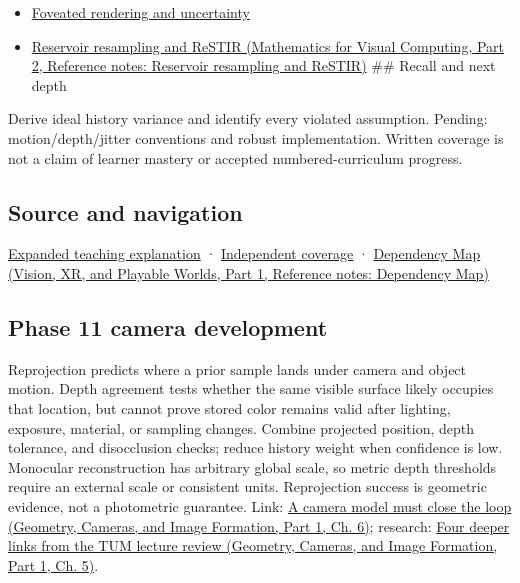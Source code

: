 \hypertarget{appendix-0727340a4428-used-by}{}

\begin{itemize}
\item
  \hyperref[appendix-5878b813b732]{Foveated rendering and uncertainty}
\item
  \href{../02-Mathematics-for-Visual-Computing-P02/main.pdf\#appendix-68be451b78b1}{Reservoir resampling and ReSTIR (Mathematics for Visual Computing, Part 2, Reference notes: Reservoir resampling and ReSTIR)} \#\# Recall and next depth
\end{itemize}

Derive ideal history variance and identify every violated assumption. Pending: motion/depth/jitter conventions and robust implementation. Written coverage is not a claim of learner mastery or accepted numbered-curriculum progress.

\subsection{Source and navigation}\label{appendix-0727340a4428-source-and-navigation}

\hypertarget{appendix-0727340a4428-source-and-navigation}{}

\hyperref[04-visual-computing-ii-ch042-temporal-reconstruction-is-an-inference-about-correspondence]{Expanded teaching explanation} · \hyperref[appendix-fd090d982a15-xr01---independent-seeing-and-representation-source]{Independent coverage} · \href{../07-Vision-XR-and-Playable-Worlds-P01/main.pdf\#appendix-4ad47bdd269a}{Dependency Map (Vision, XR, and Playable Worlds, Part 1, Reference notes: Dependency Map)}

\subsection{Phase 11 camera development}\label{appendix-0727340a4428-phase-11-camera-development}

\hypertarget{appendix-0727340a4428-phase-11-camera-development}{}

Reprojection predicts where a prior sample lands under camera and object motion. Depth agreement tests whether the same visible surface likely occupies that location, but cannot prove stored color remains valid after lighting, exposure, material, or sampling changes. Combine projected position, depth tolerance, and disocclusion checks; reduce history weight when confidence is low. Monocular reconstruction has arbitrary global scale, so metric depth thresholds require an external scale or consistent units. Reprojection success is geometric evidence, not a photometric guarantee. Link: \href{../03-Geometry-Cameras-and-Image-Formation-P01/main.pdf\#02-foundations-ii-ch037-a-camera-model-must-close-the-loop}{A camera model must close the loop (Geometry, Cameras, and Image Formation, Part 1, Ch. 6)}; research: \href{../03-Geometry-Cameras-and-Image-Formation-P01/main.pdf\#02-foundations-ii-ch036-four-deeper-links-from-the-tum-lecture-review}{Four deeper links from the TUM lecture review (Geometry, Cameras, and Image Formation, Part 1, Ch. 5)}.

